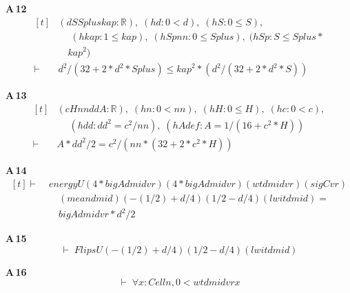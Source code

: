 \noindent\textbf{A\,12}\quad{}
{\footnotesize\[ \begin{aligned}[t]
&(\mathit{d} \mathit{S} \mathit{Splus} \mathit{kap} : \mathbb{R} ),\; (\mathit{hd} : 0 < \mathit{d}),\; (\mathit{hS} : 0 \leq \mathit{S}),\\
&\quad \; (\mathit{hkap} : 1 \leq \mathit{kap}),\; (\mathit{hSpnn} : 0 \leq \mathit{Splus}),\; (\mathit{hSp} : \mathit{S} \leq \mathit{Splus} *\\
&\quad \mathit{kap} ^{2})\\
\vdash\;&\mathit{d} ^{2} / (32 + 2 * \mathit{d} ^{2} * \mathit{Splus}) \leq \mathit{kap} ^{2} * (\mathit{d} ^{2} / (32 + 2 * \mathit{d} ^{2} * \mathit{S}))
\end{aligned} \]}

\noindent\textbf{A\,13}\quad{}
{\footnotesize\[ \begin{aligned}[t]
&(\mathit{c} \mathit{H} \mathit{nn} \mathit{dd} \mathit{A} : \mathbb{R} ),\; (\mathit{hn} : 0 < \mathit{nn}),\; (\mathit{hH} : 0 \leq \mathit{H}),\; (\mathit{hc} : 0 < \mathit{c}),\\
&\quad \; (\mathit{hdd} : \mathit{dd} ^{2} = \mathit{c} ^{2} / \mathit{nn}),\; (\mathit{hAdef} : \mathit{A} = 1 / (16 + \mathit{c} ^{2} * \mathit{H}))\\
\vdash\;&\mathit{A} * \mathit{dd} ^{2} / 2 = \mathit{c} ^{2} / (\mathit{nn} * (32 + 2 * \mathit{c} ^{2} * \mathit{H}))
\end{aligned} \]}

\noindent\textbf{A\,14}\quad{}
{\footnotesize\[ \begin{aligned}[t]
\vdash\;&\mathit{energyU} (4 * \mathit{bigA} \mathit{d} \mathit{mid} \mathit{vr}) (4 * \mathit{bigA} \mathit{d} \mathit{mid} \mathit{vr}) (\mathit{wt} \mathit{d} \mathit{mid} \mathit{vr}) (\mathit{sigC} \mathit{vr})\\
&\quad (\mathit{mean} \mathit{d} \mathit{mid}) (-(1/2) + \mathit{d}/4) (1/2 - \mathit{d}/4) (\mathit{lwit} \mathit{d} \mathit{mid}) =\\
&\quad \mathit{bigA} \mathit{d} \mathit{mid} \mathit{vr} * \mathit{d} ^{2} / 2
\end{aligned} \]}

\noindent\textbf{A\,15}\quad{}
{\footnotesize\[ \vdash\; \mathit{FlipsU} (-(1/2) + \mathit{d}/4) (1/2 - \mathit{d}/4) (\mathit{lwit} \mathit{d} \mathit{mid}) \]}

\noindent\textbf{A\,16}\quad{}
{\footnotesize\[ \vdash\; \forall \mathit{x} : \mathit{Cell} \mathit{n}, 0 < \mathit{wt} \mathit{d} \mathit{mid} \mathit{vr} \mathit{x} \]}

